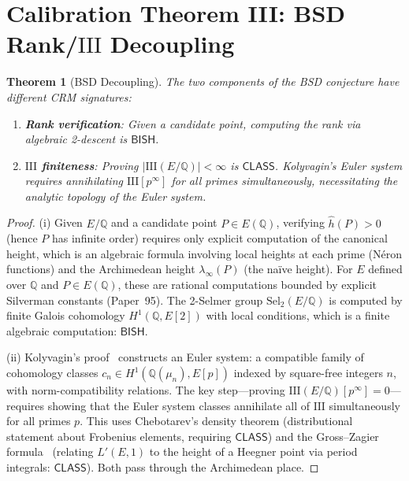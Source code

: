 \documentclass[11pt,a4paper]{article}
\newcommand{\Sha}{\mathrm{III}}
\theoremstyle{plain}
\newtheorem{theorem}{Theorem}[section]
\theoremstyle{definition}
\newcommand{\BISH}{\textsf{BISH}}
\newcommand{\CLASS}{\textsf{CLASS}}
\newcommand{\Q}{\mathbb{Q}}
\begin{document}
\section{Calibration Theorem III: BSD Rank/$\Sha$ Decoupling}\label{sec:bsd}

\begin{theorem}[BSD Decoupling]\label{thm:bsd-decouple}
The two components of the BSD conjecture have different CRM signatures:
\begin{enumerate}[label=(\roman*)]
\item \textbf{Rank verification}: Given a candidate point, computing the rank via algebraic 2-descent is $\BISH$.
\item \textbf{$\Sha$ finiteness}: Proving $|\Sha(E/\Q)| < \infty$ is $\CLASS$. Kolyvagin's Euler system requires annihilating $\Sha[p^\infty]$ for all primes simultaneously, necessitating the analytic topology of the Euler system.
\end{enumerate}
\end{theorem}

\begin{proof}
(i) Given $E/\Q$ and a candidate point $P \in E(\Q)$, verifying $\hat{h}(P) > 0$ (hence $P$ has infinite order) requires only explicit computation of the canonical height, which is an algebraic formula involving local heights at each prime (N\'eron functions) and the Archimedean height $\lambda_\infty(P)$ (the na\"ive height). For $E$ defined over $\Q$ and $P \in E(\Q)$, these are rational computations bounded by explicit Silverman constants (Paper~95). The 2-Selmer group $\mathrm{Sel}_2(E/\Q)$ is computed by finite Galois cohomology $H^1(\Q, E[2])$ with local conditions, which is a finite algebraic computation: $\BISH$.

(ii) Kolyvagin's proof~\cite{kolyvagin90} constructs an Euler system: a compatible family of cohomology classes $c_n \in H^1(\Q(\mu_n), E[p])$ indexed by square-free integers $n$, with norm-compatibility relations. The key step---proving $\Sha(E/\Q)[p^\infty] = 0$---requires showing that the Euler system classes annihilate all of $\Sha$ simultaneously for all primes $p$. This uses Chebotarev's density theorem (distributional statement about Frobenius elements, requiring $\CLASS$) and the Gross--Zagier formula~\cite{gross-zagier86} (relating $L'(E,1)$ to the height of a Heegner point via period integrals: $\CLASS$). Both pass through the Archimedean place.
\end{proof}
\end{document}
